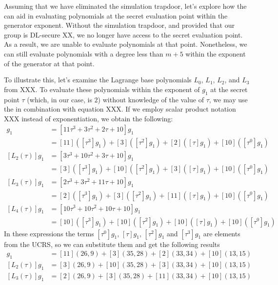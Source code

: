 \begin{example}
Assuming that we have eliminated the simulation trapdoor, let's explore how the  can aid in evaluating polynomials at the secret evaluation point within the generator exponent. Without the simulation trapdoor, and provided that our group is DL-secure XX, we no longer have access to the secret evaluation point. As a result, we are unable to evaluate polynomials at that point. Nonetheless, we can still evaluate polynomials with a degree less than $m+5$ within the exponent of the generator at that point.

To illustrate this, let's examine the Lagrange base polynomials $L_0$, $L_1$, $L_2$, and $L_3$ from XXX. To evaluate these polynomials within the exponent of $g_1$ at the secret point $\tau$ (which, in our case, is $2$) without knowledge of the value of $\tau$, we may use the  in combination with equation XXX. If we employ scalar product notation XXX instead of exponentiation, we obtain the following:
\begin{align*}
[L_1(\tau)]g_1 & = [11\tau^3 +3\tau^2 +2\tau + 10] g_1 \\
               & = [11]([\tau^3]g_1) +[3]([\tau^2]g_1) +[2]([\tau]g_1) + [10]([\tau^0] g_1) \\
[L_2(\tau)]g_1 & = [3\tau^3 +10\tau^2+ 3\tau + 10] g_1 \\
               & = [3]([\tau^3]g_1) + [10]([\tau^2]g_1) + [3]([\tau]g_1) + [10]([\tau^0]g_1) \\
[L_3(\tau)]g_1 & = [2\tau^3 + 3\tau^2 +11\tau +10 ] g_1 \\
               & = [2]([\tau^3]g_1) + [3]([\tau^2]g_1) +[11]([\tau]g_1) +[10]([\tau^0]g_1)\\
[L_4(\tau)]g_1 & = [10\tau^3 + 10 \tau^2 +10\tau + 10] g_1 \\
               & = [10]([\tau^3]g_1) + [10]([\tau^2]g_1) + [10]([\tau]g_1) + [10]([\tau^0] g_1)
\end{align*}
In these expressions the terms $[\tau^0]g_1$, $[\tau]g_1$, $[\tau^2]g_1$ and $[\tau^3]g_1$ are elements from the UCRS, so we can substitute them and get the following results
\begin{align*}
[L_1(\tau)]g_1 & = [11](26,9) +[3](35,28) +[2](33,34) + [10](13,15)\\
[L_2(\tau)]g_1 & = [3](26,9) + [10](35,28) + [3](33,34) + [10](13,15)\\
[L_3(\tau)]g_1 & = [2](26,9) + [3](35,28) +[11](33,34) +[10](13,15)\\

\end{align*}
\end{example}
